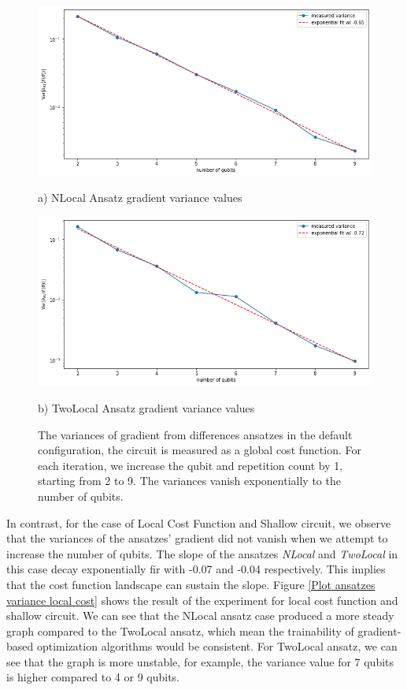 \begin{figure}
    \includegraphics[width=\textwidth]{Artefact/Appendices/NLocalDefault.png}
    \centerline{a) NLocal Ansatz gradient variance values}
    \includegraphics[width=\textwidth]{Artefact/Appendices/TwoLocalDefault.png}
    \centerline{b) TwoLocal Ansatz gradient variance values}
    \caption{
        The variances of gradient from differences ansatzes in the default configuration, the circuit is measured as a global cost function.
        For each iteration, we increase the qubit and repetition count by 1, starting from 2 to 9.
        The variances vanish exponentially to the number of qubits.
    }
    \label{Plot ansatzes variance default}
\end{figure}

In contrast, for the case of Local Cost Function and Shallow circuit, we observe that the variances of the ansatzes' gradient did not vanish when we attempt to increase the number of qubits.
The slope of the ansatzes \emph{NLocal} and \emph{TwoLocal} in this case decay exponentially fir with -0.07 and -0.04 respectively.
This implies that the cost function landscape can sustain the slope.
Figure \ref{Plot ansatzes variance local cost} shows the result of the experiment for local cost function and shallow circuit.
We can see that the NLocal ansatz case produced a more steady graph compared to the TwoLocal ansatz, which mean the trainability of gradient-based optimization algorithms would be consistent.
For TwoLocal ansatz, we can see that the graph is more unstable, for example, the variance value for 7 qubits is higher compared to 4 or 9 qubits.

